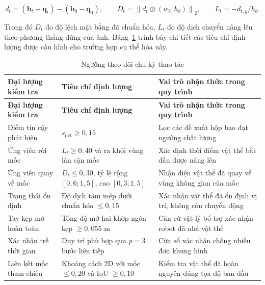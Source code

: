 \begin{equation}
d_t = (\mathbf b_t - \mathbf q_t) - (\mathbf b_0 - \mathbf q_0),\qquad
D_t = \left\| d_t \oslash (w_b, h_b) \right\|_2,\qquad
L_t = -d_{t,y} / h_b.
\label{eq:case-study-geometry}
\end{equation}

Trong đó $D_t$ đo độ lệch mặt bằng đã chuẩn hóa, $L_t$ đo độ dịch chuyển nâng lên theo phương thẳng đứng của ảnh. Bảng~\ref{tab:case-study-thresholds} trình bày chi tiết các tiêu chí định lượng được cấu hình cho trường hợp cụ thể hóa này.

\begingroup\small\setlength{\tabcolsep}{4pt}\renewcommand{\arraystretch}{1.15}
\begin{longtable}{>{\raggedright\arraybackslash}p{}|>{\raggedright\arraybackslash}p{}|>{\raggedright\arraybackslash}p{}}
\caption{Ngưỡng theo dõi chu kỳ thao tác}\label{tab:case-study-thresholds}\\
\toprule
\textbf{Đại lượng kiểm tra} & \textbf{Tiêu chí định lượng} & \textbf{Vai trò nhận thức trong quy trình} \\
\midrule\endfirsthead
\toprule
\textbf{Đại lượng kiểm tra} & \textbf{Tiêu chí định lượng} & \textbf{Vai trò nhận thức trong quy trình} \\
\midrule\endhead
\bottomrule\endfoot
Điểm tin cậy phát hiện & $s_{\mathrm{det}} \ge 0{,}15$ & Lọc các đề xuất hộp bao đạt ngưỡng chất lượng \\
Ứng viên rời mốc & $L_t \ge 0{,}40$ và ra khỏi vùng lân cận mốc & Xác định thời điểm vật thể bắt đầu được nâng lên \\
Ứng viên quay về mốc & $D_t \le 0{,}30$, tỷ lệ rộng $[0{,}6; 1{,}5]$, cao $[0{,}3; 1{,}5]$ & Nhận diện vật thể đã quay về vùng không gian của mốc \\
Trạng thái ổn định & Độ dịch tâm mép dưới chuẩn hóa $\le 0{,}15$ & Xác nhận vật thể đã ổn định vị trí, không còn chuyển động \\
Tay kẹp mở hoàn toàn & Tổng độ mở hai khớp ngón kẹp $\ge 0{,}055$ m & Căn cứ vật lý bổ trợ xác nhận robot đã nhả vật thể \\
Xác nhận trễ thời gian & Duy trì phù hợp qua $p = 3$ bước liên tiếp & Cửa sổ xác nhận chống nhiễu đơn khung hình \\
Liên kết mốc tham chiếu & Khoảng cách 2D với mốc $\le 0{,}20$ và IoU $\ge 0{,}10$ & Kiểm tra vật thể đã hoàn nguyên đúng tọa độ ban đầu \\
\end{longtable}
\endgroup


